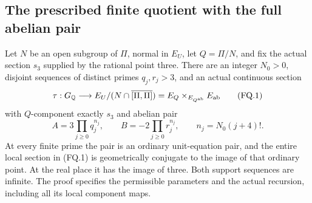 \subsection{The prescribed finite quotient with the full abelian pair}

\begin{theorem}
\label{thm:ghost-finite-quotient-survival}
Let \(N\) be an open subgroup of \(\Pi\), normal in
\(E_U\), let \(Q=\Pi/N\), and fix the actual section
\(s_3\) supplied by the rational point three.
There are an integer \(N_0>0\), disjoint sequences of
distinct primes \(q_j,r_j>3\), and an actual continuous
section
\[
 \tau:G_{\mathbb Q}\longrightarrow
 E_U/(N\cap\overline{[\Pi,\Pi]})
   =E_Q\mathbin{\times}_{E_{Q^{\rm ab}}}E_{\rm ab}
 \tag{FQ.1}
\]
with \(Q\)-component exactly \(s_3\) and abelian pair
\[
 A=3\prod_{j\ge0}q_j^{n_j},\qquad
 B=-2\prod_{j\ge0}r_j^{n_j},\qquad
 n_j=N_0(j+4)!.
 \tag{FQ.2}
\]
At every finite prime the pair is an ordinary
unit-equation pair, and the entire local section
in (FQ.1) is geometrically conjugate to the image
of that ordinary point. At the real place it has
the image of three. Both support sequences are
infinite. The proof specifies the permissible
parameters and the actual recursion, including
all its local component maps.
\end{theorem}
